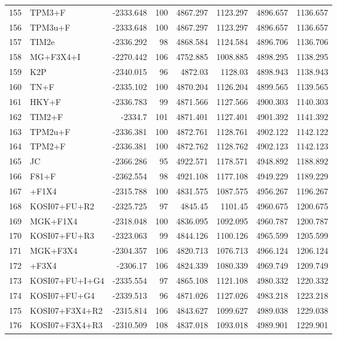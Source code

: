 \documentclass[12pt]{article}
\begin{document}
\begin{longtable}{clrrrrrr}
	155 & TPM3+F & -2333.648 & 100 & 4867.297 & 1123.297 & 4896.657 & 1136.657 \\ 
	156 & TPM3u+F & -2333.648 & 100 & 4867.297 & 1123.297 & 4896.657 & 1136.657 \\ 
	157 & TIM2e & -2336.292 & 98 & 4868.584 & 1124.584 & 4896.706 & 1136.706 \\ 
	158 & MG+F3X4+I & -2270.442 & 106 & 4752.885 & 1008.885 & 4898.295 & 1138.295 \\ 
	159 & K2P & -2340.015 & 96 & 4872.03 & 1128.03 & 4898.943 & 1138.943 \\ 
	160 & TN+F & -2335.102 & 100 & 4870.204 & 1126.204 & 4899.565 & 1139.565 \\ 
	161 & HKY+F & -2336.783 & 99 & 4871.566 & 1127.566 & 4900.303 & 1140.303 \\ 
	162 & TIM2+F & -2334.7 & 101 & 4871.401 & 1127.401 & 4901.392 & 1141.392 \\ 
	163 & TPM2u+F & -2336.381 & 100 & 4872.761 & 1128.761 & 4902.122 & 1142.122 \\ 
	164 & TPM2+F & -2336.381 & 100 & 4872.762 & 1128.762 & 4902.123 & 1142.123 \\ 
	165 & JC & -2366.286 & 95 & 4922.571 & 1178.571 & 4948.892 & 1188.892 \\ 
	166 & F81+F & -2362.554 & 98 & 4921.108 & 1177.108 & 4949.229 & 1189.229 \\ 
	167 & \gy+F1X4 & -2315.788 & 100 & 4831.575 & 1087.575 & 4956.267 & 1196.267 \\ 
	168 & KOSI07+FU+R2 & -2325.725 & 97 & 4845.45 & 1101.45 & 4960.675 & 1200.675 \\ 
	169 & MGK+F1X4 & -2318.048 & 100 & 4836.095 & 1092.095 & 4960.787 & 1200.787 \\ 
	170 & KOSI07+FU+R3 & -2323.063 & 99 & 4844.126 & 1100.126 & 4965.599 & 1205.599 \\ 
	171 & MGK+F3X4 & -2304.357 & 106 & 4820.713 & 1076.713 & 4966.124 & 1206.124 \\ 
	172 & \gy+F3X4 & -2306.17 & 106 & 4824.339 & 1080.339 & 4969.749 & 1209.749 \\ 
	173 & KOSI07+FU+I+G4 & -2335.554 & 97 & 4865.108 & 1121.108 & 4980.332 & 1220.332 \\ 
	174 & KOSI07+FU+G4 & -2339.513 & 96 & 4871.026 & 1127.026 & 4983.218 & 1223.218 \\ 
	175 & KOSI07+F3X4+R2 & -2315.814 & 106 & 4843.627 & 1099.627 & 4989.038 & 1229.038 \\ 
	176 & KOSI07+F3X4+R3 & -2310.509 & 108 & 4837.018 & 1093.018 & 4989.901 & 1229.901 \\ 

\end{longtable}
\end{document}
